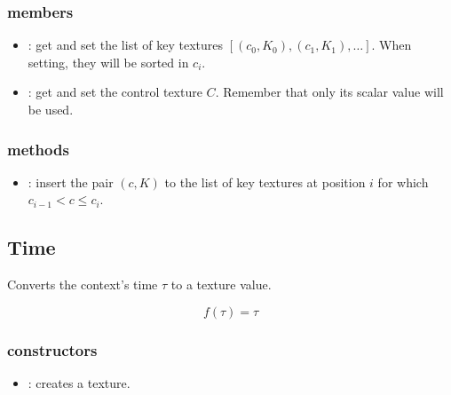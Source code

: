 \subsubsection*{members}
\begin{itemize}
	\item {}:
		get and set the list of key textures $\left[\left(c_0, K_0\right), \left(c_1, K_1\right), \ldots\right]$.  When setting, they will be sorted in $c_i$.
	\item {}:
		get and set the control texture $C$.  Remember that only its scalar value will be used.
\end{itemize}


\subsubsection*{methods}
\begin{itemize}
	\item {}:
		insert the pair $\left(c, K\right)$ to the list of key textures at position $i$ for which $c_{i-1} < c \leq c_i$.
\end{itemize}

 
\subsection{Time}

Converts the context's time $\tau$ to a texture value.

\begin{equation}
	f\left(\tau\right) = \tau
\end{equation}

\subsubsection*{constructors}
\begin{itemize}
	\item {}:
		creates a  texture.
\end{itemize}

